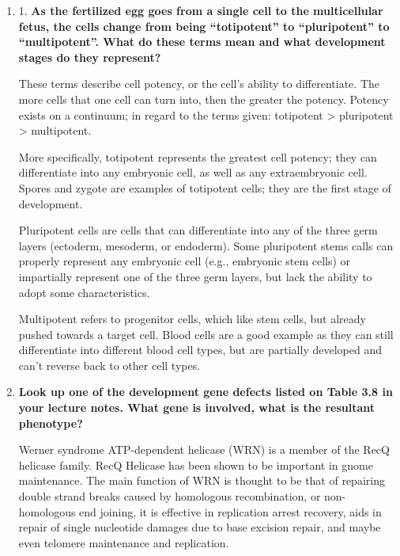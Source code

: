 \documentclass[plain,basic]{inVerba-notes}
\begin{document}
  \begin{enumerate}
    \item 1. \textbf{As the fertilized egg goes from a single cell to the multicellular fetus, the cells change from being “totipotent” to “pluripotent” to “multipotent”. What do these terms mean and what development stages do they represent?}
    
    These terms describe cell potency, or the cell's ability to differentiate. The more cells that one cell can turn into, then the greater the potency. Potency exists on a continuum; in regard to the terms given: totipotent > pluripotent > multipotent.

    More specifically, totipotent represents the greatest cell potency; they can differentiate into any embryonic cell, as well as any extraembryonic cell. Spores and zygote are examples of totipotent cells; they are the first stage of development.

    Pluripotent cells are cells that can differentiate into any of the three germ layers (ectoderm, mesoderm, or endoderm). Some pluripotent stems calls can properly represent any embryonic cell (e.g., embryonic stem cells) or impartially represent one of the three germ layers, but lack the ability to adopt some characteristics.  

    Multipotent refers to progenitor cells, which like stem cells, but already pushed towards a target cell. Blood cells are a good example as they can still differentiate into different blood cell types, but are partially developed and can't reverse back to other cell types.
    
    \item \textbf{Look up one of the development gene defects listed on Table 3.8 in your lecture notes. What gene is involved, what is the resultant phenotype?} 
    
    Werner syndrome ATP-dependent helicase (WRN) is a member of the RecQ  helicase family. RecQ Helicase has been shown to be important in gnome maintenance. The main function of WRN is thought to be that of repairing double strand breaks caused by homologous recombination, or non-homologous end joining, it is effective in replication arrest recovery, aids in repair of single nucleotide damages due to base excision repair, and maybe even telomere maintenance and replication. 



\end{enumerate}
\end{document}
